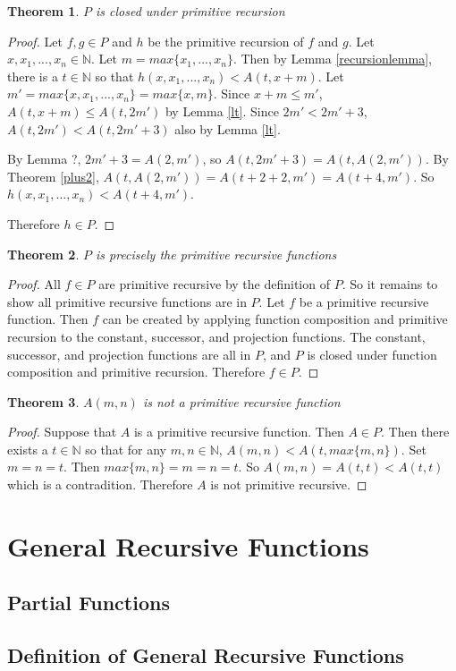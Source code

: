 \documentclass[12pt, letterpaper]{article}
\newtheorem{theorem}{Theorem}
\theoremstyle{case}
\begin{document}
    \begin{theorem}
      $P$ is closed under primitive recursion
    \end{theorem}
    \begin{proof}
      Let $f, g \in P$ and $h$ be the primitive recursion of $f$ and $g$.
      Let $x, x_1, ..., x_n \in \mathbb{N}$.
      Let $m = max\{x_1, ..., x_n\}$.
      Then by Lemma \ref{recursionlemma}, there is a $t \in \mathbb{N}$ so that
      $h(x, x_1, ..., x_n) < A(t, x + m)$.
      Let $m' = max\{x, x_1, ..., x_n\} = max\{x, m\}$.
      Since $x + m \leq m'$, $A(t, x + m) \leq A(t, 2m')$ by Lemma \ref{lt}.
      Since $2m' < 2m' + 3$, $A(t, 2m') < A(t, 2m' + 3)$ also by Lemma \ref{lt}.

      By Lemma ?, $2m' + 3 = A(2, m')$, so $A(t, 2m' + 3) = A(t, A(2, m'))$.
      By Theorem \ref{plus2}, $A(t, A(2, m')) = A(t + 2 + 2, m') = A(t + 4, m')$.
      So $h(x, x_1, ..., x_n) < A(t + 4, m')$.

      Therefore $h \in P$.
    \end{proof}

    \begin{theorem}
      $P$ is precisely the primitive recursive functions
    \end{theorem}
    \begin{proof}
      All $f \in P$ are primitive recursive by the definition of $P$.
      So it remains to show all primitive recursive functions are in $P$.
      Let $f$ be a primitive recursive function.
      Then $f$ can be created by applying function composition and primitive recursion to the constant, successor, and
      projection functions. The constant, successor, and projection functions are all in $P$, and $P$ is closed under
      function composition and primitive recursion. Therefore $f \in P$.
    \end{proof}

    \begin{theorem}
      $A(m, n)$ is not a primitive recursive function
    \end{theorem}
    \begin{proof}
      Suppose that $A$ is a primitive recursive function. Then $A \in P$. Then there exists a $t \in \mathbb{N}$
      so that for any $m, n \in \mathbb{N}$, $A(m, n) < A(t, max\{m, n\})$.
      Set $m = n = t$. Then $max\{m, n\} = m = n = t$. So $A(m, n) = A(t, t) < A(t, t)$ which is a contradition.
      Therefore $A$ is not primitive recursive.
    \end{proof}


  \section{General Recursive Functions}
    \subsection{Partial Functions}
    \subsection{Definition of General Recursive Functions}
\end{document}
